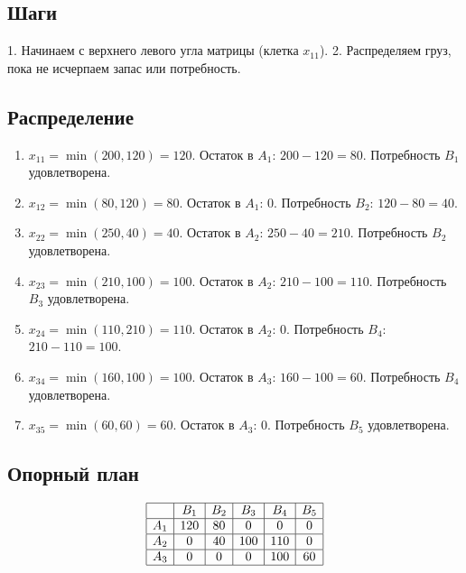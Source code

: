 \documentclass{article}
\begin{document}
\subsection{Шаги}
1. Начинаем с верхнего левого угла матрицы (клетка \( x_{11} \)).  
2. Распределяем груз, пока не исчерпаем запас или потребность.

\subsection{Распределение}
\begin{enumerate}
\item \( x_{11} = \min(200, 120) = 120 \).  
Остаток в \( A_1 \): \( 200 - 120 = 80 \).  
Потребность \( B_1 \) удовлетворена.

\item \( x_{12} = \min(80, 120) = 80 \).  
Остаток в \( A_1 \): 0.  
Потребность \( B_2 \): \( 120 - 80 = 40 \).

\item \( x_{22} = \min(250, 40) = 40 \).  
Остаток в \( A_2 \): \( 250 - 40 = 210 \).  
Потребность \( B_2 \) удовлетворена.

\item \( x_{23} = \min(210, 100) = 100 \).  
Остаток в \( A_2 \): \( 210 - 100 = 110 \).  
Потребность \( B_3 \) удовлетворена.

\item \( x_{24} = \min(110, 210) = 110 \).  
Остаток в \( A_2 \): 0.  
Потребность \( B_4 \): \( 210 - 110 = 100 \).

\item \( x_{34} = \min(160, 100) = 100 \).  
Остаток в \( A_3 \): \( 160 - 100 = 60 \).  
Потребность \( B_4 \) удовлетворена.

\item \( x_{35} = \min(60, 60) = 60 \).  
Остаток в \( A_3 \): 0.  
Потребность \( B_5 \) удовлетворена.
\end{enumerate}

\subsection{Опорный план}
\[
\begin{array}{|c|c|c|c|c|c|}
\hline
 & B_1 & B_2 & B_3 & B_4 & B_5 \\
\hline
A_1 & 120 & 80 & 0 & 0 & 0 \\
\hline
A_2 & 0 & 40 & 100 & 110 & 0 \\
\hline
A_3 & 0 & 0 & 0 & 100 & 60 \\
\hline
\end{array}
\]
\end{document}
